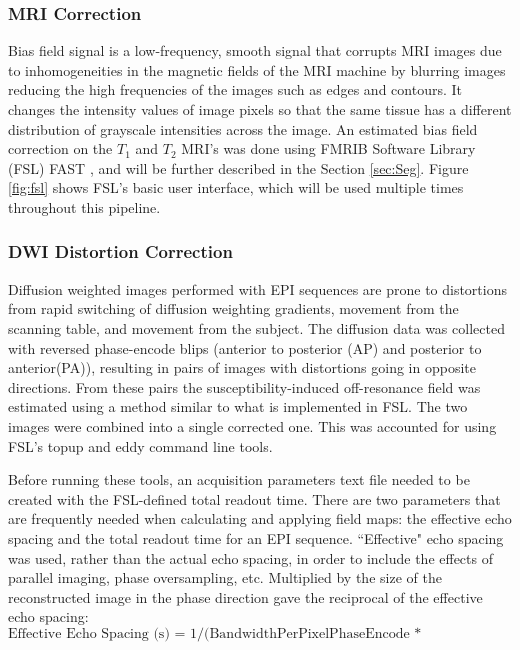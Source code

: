 \subsubsection{MRI Correction}

Bias field signal is a low-frequency, smooth signal that corrupts MRI images due to inhomogeneities in the magnetic fields of the MRI machine by blurring images reducing the high frequencies of the images such as edges and contours. It changes the intensity values of image pixels so that the same tissue has a different distribution of grayscale intensities across the image. \cite{ref:bias} An estimated bias field correction on the $T_1$ and $T_2$ MRI's was done using FMRIB Software Library (FSL) FAST \cite{ref:fslfast}, and will be further described in the Section \ref{sec:Seg}. Figure \ref{fig:fsl} shows FSL's basic user interface, which will be used multiple times throughout this pipeline. 

\subsubsection{DWI Distortion Correction}

Diffusion weighted images performed with EPI sequences are prone to distortions from rapid switching of diffusion weighting gradients, movement from the scanning table, and movement from the subject. The diffusion data was collected with reversed phase-encode blips (anterior to posterior (AP) and posterior to anterior(PA)), resulting in pairs of images with distortions going in opposite directions. From these pairs the susceptibility-induced off-resonance field was estimated using a method \cite{ref:fsltopup1} similar to what is implemented in FSL.\cite{ref:fsltopup2} The two images were combined into a single corrected one. This was accounted for using FSL's topup and eddy command line tools.

Before running these tools, an acquisition parameters text file needed to be created with the FSL-defined total readout time. There are two parameters that are frequently needed when calculating and applying field maps: the effective echo spacing and the total readout time for an EPI sequence. ``Effective" echo spacing was used, rather than the actual echo spacing, in order to include the effects of parallel imaging, phase oversampling, etc. Multiplied by the size of the reconstructed image in the phase direction gave the reciprocal of the effective echo spacing:
\[
\text{Effective Echo Spacing (s) = 1/(BandwidthPerPixelPhaseEncode * MatrixSizePhase)}
\]


